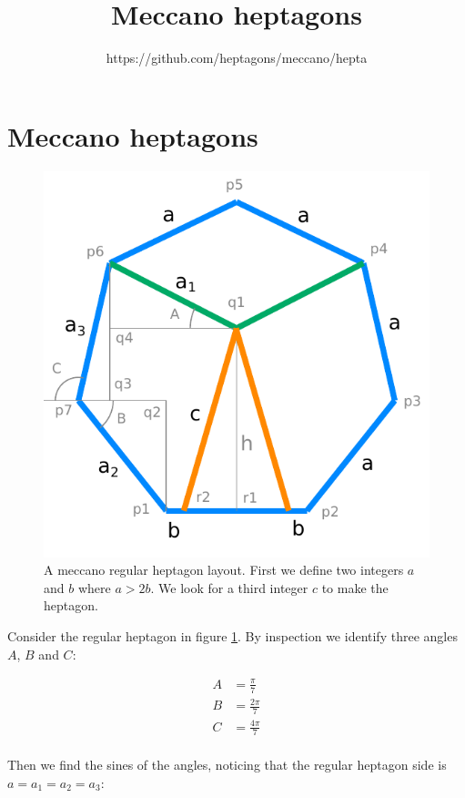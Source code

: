 \documentclass[11pt]{article}
\title{\textbf{Meccano heptagons}}
\author{https://github.com/heptagons/meccano/hepta}
\date{}
\begin{document}
\maketitle

\section{Meccano heptagons}

\begin{figure}[htp]
\centering
\includegraphics[scale=1]{figs/heptagon_plan.pdf}
\caption{A meccano regular heptagon layout. First we define two integers $a$ and $b$ where $a > 2b$. We look for a third integer $c$ to make the heptagon.}
\label{heptagonplan}
\end{figure}

Consider the regular heptagon in figure \ref{heptagonplan}.
By inspection we identify three angles $A$, $B$ and $C$:

\begin{align*}
A &= \frac{\pi}{7} \\
B &= \frac{2\pi}{7} \\
C &= \frac{4\pi}{7} \\
\end{align*}

Then we find the sines of the angles, noticing that the regular heptagon side is $a = a_1 = a_2 = a_3$:
\end{document}
